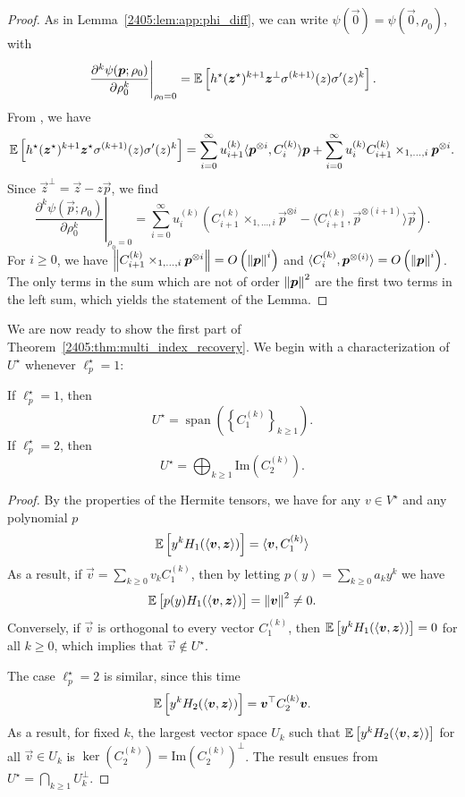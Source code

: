 \begin{proof}
    As in Lemma~\ref{2405:lem:app:phi_diff}, we can write $\psi(\vec{0}) = \psi(\vec{0}, \rho_0)$, with
    \[  \left.\frac{\partial^k \psi({\boldsymbol{p}}; \rho_0)}{\partial \rho_0^k}\right|_{\rho_0 = 0} = \mathbb{E}\left[h^\star({\boldsymbol{z}}^\star)^{k+1} {\boldsymbol{z}}^\bot \sigma^{(k+1)}(z) \sigma'(z)^k\right]. \]
     From \cite[Lemma 19]{dandi2023how}, we have
    \[ \mathbb{E}\left[h^\star({\boldsymbol{z}}^\star)^{k+1} {\boldsymbol{z}}^\star \sigma^{(k+1)}(z) \sigma'(z)^k\right] = \sum_{i=0}^\infty u_{i+1}^{(k)} \langle {\boldsymbol{p}}^{\otimes i}, C_i^{(k)} \rangle {\boldsymbol{p}} + \sum_{i = 0}^\infty u_{i}^{(k)} C_{i+1}^{(k)} \times_{1, \dots, i} {\boldsymbol{p}}^{\otimes i}. \]
    Since $\vec{z}^\bot = \vec{z} - z\vec{p}$, we find
    \begin{equation}
        \left.\frac{\partial^k \psi(\vec{p}; \rho_0)}{\partial \rho_0^k}\right|_{\rho_0 = 0} = \sum_{i=0}^{\infty} u_i^{(k)} \left( C_{i+1}^{(k)} \times_{1, \dots, i} \vec{p}^{\otimes i} - \langle C_{i+1}^{(k)}, \vec{p}^{\otimes (i+1)} \rangle \vec{p} \right).
    \end{equation}
    For $i \geq 0$, we have $\left\lVert C_{i+1}^{(k)} \times_{1, \dots, i} {\boldsymbol{p}}^{\otimes i}\right\rVert = O\left(\left\lVert {\boldsymbol{p}}\right\rVert^i\right)$ and $\langle C_{i}^{(k)}, {\boldsymbol{p}}^{\otimes (i)} \rangle = O\left(\left\lVert {\boldsymbol{p}}\right\rVert^i\right)$. The only terms in the sum which are not of order $\left\lVert {\boldsymbol{p}}\right\rVert^2$ are the first two terms in the left sum, which yields the statement of the Lemma.
\end{proof}

We are now ready to show the first part of Theorem~\ref{2405:thm:multi_index_recovery}. We begin with a characterization of $U^\star$ whenever $\ell_p^\star = 1$:
\begin{lemma}
    If $\ell_p^\star = 1$, then
    \[ U^\star = \operatorname{span}\left(\left\{C_1^{(k)}\right\}_{k \geq 1}\right). \]
    If $\ell_p^\star = 2$, then
    \[ U^\star = \bigoplus_{k\geq 1}\mathrm{Im}\left(C_2^{(k)}\right). \]
\end{lemma}

\begin{proof}
    By the properties of the Hermite tensors, we have for any $v \in V^\star$ and any polynomial $p$
    \[ \mathbb{E}\left[y^k H_1(\langle {\boldsymbol{v}}, {\boldsymbol{z}} \rangle)\right] = \langle {\boldsymbol{v}}, C_1^{(k)} \rangle \]
    As a result, if $\vec{v} = \sum_{k \geq 0} v_k C_1^{(k)}$, then by letting $p(y) = \sum_{k \geq 0} a_k y^k$ we have
    \[ \mathbb{E}\left[p(y) H_1(\langle {\boldsymbol{v}}, {\boldsymbol{z}} \rangle)\right] = \left\lVert {\boldsymbol{v}}\right\rVert^2 \neq 0.\]
    Conversely, if $\vec{v}$ is orthogonal to every vector $C_1^{(k)}$, then $\mathbb{E}\left[y^k H_1(\langle {\boldsymbol{v}}, {\boldsymbol{z}} \rangle)\right] = 0$ for all $k \geq 0$, which implies that $\vec{v} \notin U^\star$.

    The case $\ell_p^\star = 2$ is similar, since this time
    \[ \mathbb{E}\left[y^k H_2(\langle {\boldsymbol{v}}, {\boldsymbol{z}} \rangle)\right] = {\boldsymbol{v}}^\top C_2^{(k)} {\boldsymbol{v}}. \]
    As a result, for fixed $k$, the largest vector space $U_k$ such that $\mathbb{E}\left[y^k H_2(\langle {\boldsymbol{v}}, {\boldsymbol{z}} \rangle)\right]$ for all $\vec{v}\in U_k$ is $\ker(C_2^{(k)}) = \mathrm{Im}(C_2^{(k)})^\bot$. The result ensues from $U^\star = \bigcap_{k \geq 1} U_k^\bot$.
\end{proof}


